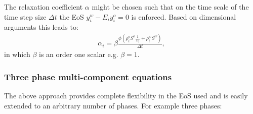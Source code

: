 The relaxation coefficient $\alpha$ might be chosen such that
on the time scale of the time step size $\Delta t$ the EoS
$y_i^w - E_i y_i^o=0$ is enforced.
Based on dimensional arguments this leads to:
\begin{eqnarray}
\alpha_i= \beta \frac{\phi (\rho_i^o S^o
\frac{1}{E_i}
+\rho_i^w S^w )}{\Delta t} ,
\end{eqnarray}
in which $\beta$ is an order one scalar e.g. $\beta=1$.

\subsubsection{Three phase multi-component equations}
\label{Three phase system}
The above approach provides complete flexibility in the EoS used
and is easily extended to an arbitrary number of phases.
For example three phases:

